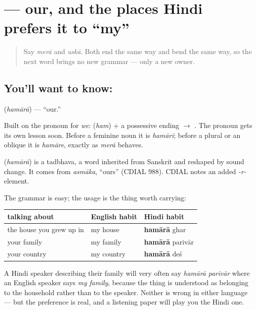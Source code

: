 \section[\texorpdfstring{\hi{हमारा} (hamārā)}{हमारा (hamārā)}]{ — our, and the places Hindi prefers it to \textquotedblleft{}my\textquotedblright{}}

\label{lesson:HI-C84-hamara}



\begin{quote}
Say \emph{merā} and \emph{uskā}. Both end the same way and bend the same way, so the next word brings no new grammar — only a new owner.
\end{quote}

\subsection*{You'll want to know: }
\textbf{} (\emph{hamārā}) — \textquotedblleft{}our.\textquotedblright{}

Built on the pronoun for \emph{we}: \textbf{} (\emph{ham}) + a possessive ending $\to$ \textbf{}. The pronoun gets its own lesson soon. Before a feminine noun it is \emph{hamārī}; before a plural or an oblique it is \emph{hamāre}, exactly as \emph{merā} behaves.

\begin{cousinweb}
\textbf{} (\emph{hamārā}) is a tadbhava, a word inherited from Sanskrit and reshaped by sound change. It comes from \emph{asmāka}, \textquotedblleft{}ours\textquotedblright{} (CDIAL 988). CDIAL notes an added \emph{-r-} element.
\end{cousinweb}

\begin{grammarlens}[title={Grammar Lens: where Hindi says \textquotedblleft{}our\textquotedblright{} and English says \textquotedblleft{}my\textquotedblright{}}]
The grammar is easy; the usage is the thing worth carrying:

\noindent
\begin{tabularx}{\linewidth}{@{}>{\raggedright\arraybackslash}X>{\raggedright\arraybackslash}X>{\raggedright\arraybackslash}X@{}}
\toprule
\textbf{talking about} & \textbf{English habit} & \textbf{Hindi habit} \\
\midrule
the house you grew up in & my house & \textbf{hamārā} ghar \\
your family & my family & \textbf{hamārā} parivār \\
your country & my country & \textbf{hamārā} deś \\
\bottomrule
\end{tabularx}

A Hindi speaker describing their family will very often say \emph{hamārā parivār} where an English speaker says \emph{my family}, because the thing is understood as belonging to the household rather than to the speaker. Neither is wrong in either language — but the preference is real, and a listening paper will play you the Hindi one.
\end{grammarlens}

